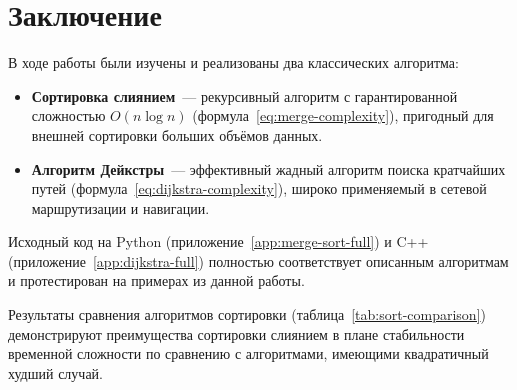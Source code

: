 \chapter{Заключение}

В ходе работы были изучены и реализованы два классических алгоритма:

\begin{itemize}
  \item \textbf{Сортировка слиянием}~--- рекурсивный алгоритм с гарантированной
        сложностью $O(n \log n)$ (формула~\eqref{eq:merge-complexity}),
        пригодный для внешней сортировки больших объёмов данных.
  \item \textbf{Алгоритм Дейкстры}~--- эффективный жадный алгоритм поиска
        кратчайших путей (формула~\eqref{eq:dijkstra-complexity}),
        широко применяемый в сетевой маршрутизации и навигации.
\end{itemize}

Исходный код на Python (приложение~\ref{app:merge-sort-full}) и C++
(приложение~\ref{app:dijkstra-full}) полностью соответствует описанным
алгоритмам и протестирован на примерах из данной работы.

Результаты сравнения алгоритмов сортировки (таблица~\ref{tab:sort-comparison})
демонстрируют преимущества сортировки слиянием в плане стабильности
временной сложности по сравнению с алгоритмами, имеющими квадратичный
худший случай.
